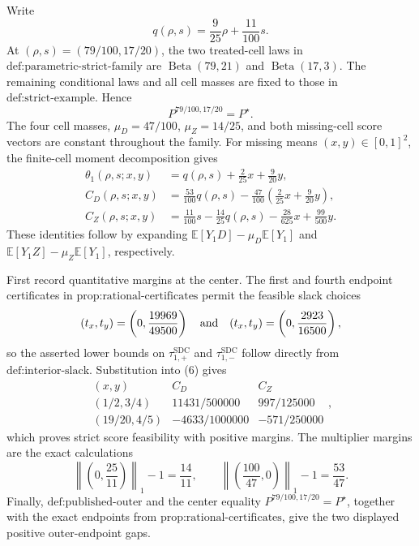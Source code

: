 Write
\[
 q(\rho,s)=\frac{9}{25}\rho+\frac{11}{100}s.
\]
At \((\rho,s)=(79/100,17/20)\), the two treated-cell laws in \(\text{def:parametric-strict-family}\) are \(\operatorname{Beta}(79,21)\) and \(\operatorname{Beta}(17,3)\).  The remaining conditional laws and all cell masses are fixed to those in \(\text{def:strict-example}\).  Hence
\[
 P^{79/100,17/20}=P^\star.
\]
The four cell masses, \(\mu_D=47/100\), \(\mu_Z=14/25\), and both missing-cell score vectors are constant throughout the family.  For missing means \((x,y)\in[0,1]^2\), the finite-cell moment decomposition gives
\[
 \begin{aligned}
 \theta_1(\rho,s;x,y)
   &=q(\rho,s)+\frac{2}{25}x+\frac{9}{20}y,\\
 C_D(\rho,s;x,y)
   &=\frac{53}{100}q(\rho,s)
     -\frac{47}{100}\left(\frac{2}{25}x+\frac{9}{20}y\right),\\
 C_Z(\rho,s;x,y)
   &=\frac{11}{100}s-\frac{14}{25}q(\rho,s)
     -\frac{28}{625}x+\frac{99}{500}y.
 \end{aligned} \tag{6}
\]
These identities follow by expanding \(\mathbb E[Y_1D]-\mu_D\mathbb E[Y_1]\) and \(\mathbb E[Y_1Z]-\mu_Z\mathbb E[Y_1]\), respectively.

First record quantitative margins at the center.  The first and fourth endpoint certificates in \(\text{prop:rational-certificates}\) permit the feasible slack choices
\[
 (t_x,t_y)=\left(0,\frac{19969}{49500}\right)
 \quad\hbox{and}\quad
 (t_x,t_y)=\left(0,\frac{2923}{16500}\right),
\]
so the asserted lower bounds on \(\tau_{1,+}^{\mathrm{SDC}}\) and \(\tau_{1,-}^{\mathrm{SDC}}\) follow directly from \(\text{def:interior-slack}\).  Substitution into (6) gives
\[
 \begin{array}{c|cc}
 (x,y)&C_D&C_Z\\ \hline
 (1/2,3/4)&11431/500000&997/125000\\
 (19/20,4/5)&-4633/1000000&-571/250000
 \end{array}, \tag{7}
\]
which proves strict score feasibility with positive margins.  The multiplier margins are the exact calculations
\[
 \left\|\left(0,\frac{25}{11}\right)\right\|_1-1=\frac{14}{11},
 \qquad
 \left\|\left(\frac{100}{47},0\right)\right\|_1-1=\frac{53}{47}.
\]
Finally, \(\text{def:published-outer}\) and the center equality \(P^{79/100,17/20}=P^\star\), together with the exact endpoints from \(\text{prop:rational-certificates}\), give the two displayed positive outer-endpoint gaps.

